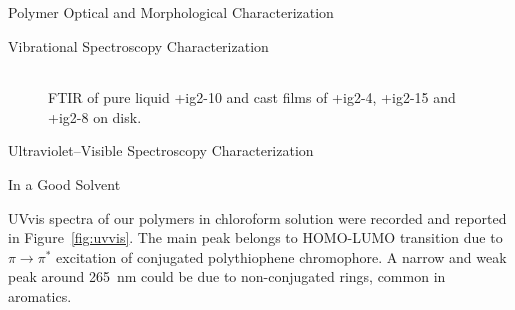\begin{section}{Polymer Optical and Morphological Characterization}
\begin{subsection}{Vibrational Spectroscopy Characterization}
\begin{table}
\begin{tabular}{c|c|c|c|c}
\bottomrule
\end{tabular} 
\end{table}

\begin{landscape}%

\thispagestyle{empty}

\centering
\begin{figure}%
\centering
{}
\caption[FT-IR of \cmpd+{ig2-10}, \cmpd+{ig2-4}, \cmpd+{ig2-15} and \cmpd+{ig2-8}.]{\gls{FTIR} of pure liquid \cmpd+{ig2-10} and cast films of \cmpd+{ig2-4}, \cmpd+{ig2-15} and \cmpd+{ig2-8} on  disk. 
}
\label{fig:ir}
\end{figure}
\end{landscape}

\restoregeometry
\end{subsection}
\clearpage

\begin{subsection}{Ultraviolet--Visible Spectroscopy Characterization}
\begin{subsubsection}{In a Good Solvent}

\Acrfull{UVvis} spectra of our polymers in chloroform solution were recorded and reported in Figure~\ref{fig:uvvis}. The main peak belongs to \gls{HOMO}-\gls{LUMO} transition due to $\pi \rightarrow \pi^*$ excitation of conjugated poly\-thio\-phene chromophore. A narrow and weak peak around \SI{265}{\nm} \label{peak-265} could be due to 
non-conjugated rings, common in aromatics.


\end{subsubsection}
\end{subsection}
\end{section}

